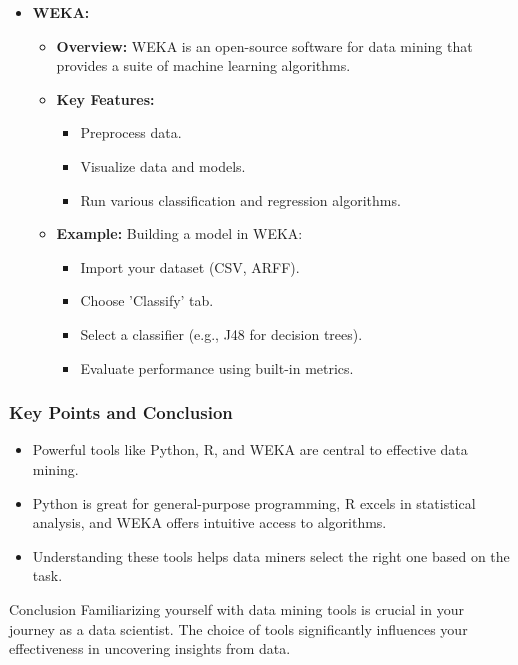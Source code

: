 \documentclass[aspectratio=169]{beamer}
\begin{document}
\begin{frame}[fragile]
    \begin{itemize}
        \item \textbf{WEKA:}
            \begin{itemize}
                \item \textbf{Overview:} WEKA is an open-source software for data mining that provides a suite of machine learning algorithms. 
                \item \textbf{Key Features:}
                    \begin{itemize}
                        \item Preprocess data.
                        \item Visualize data and models.
                        \item Run various classification and regression algorithms.
                    \end{itemize}
                \item \textbf{Example:} Building a model in WEKA:
                    \begin{itemize}
                        \item Import your dataset (CSV, ARFF).
                        \item Choose 'Classify' tab.
                        \item Select a classifier (e.g., J48 for decision trees).
                        \item Evaluate performance using built-in metrics.
                    \end{itemize}
            \end{itemize}
    \end{itemize}
\end{frame}

\begin{frame}
    \frametitle{Key Points and Conclusion}
    \begin{itemize}
        \item Powerful tools like Python, R, and WEKA are central to effective data mining.
        \item Python is great for general-purpose programming, R excels in statistical analysis, and WEKA offers intuitive access to algorithms.
        \item Understanding these tools helps data miners select the right one based on the task.
    \end{itemize}
    \begin{block}{Conclusion}
        Familiarizing yourself with data mining tools is crucial in your journey as a data scientist. The choice of tools significantly influences your effectiveness in uncovering insights from data.
    \end{block}
\end{frame}
\end{document}

